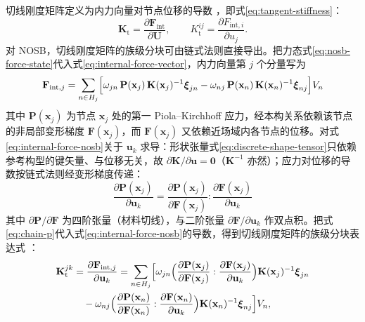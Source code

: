 切线刚度矩阵定义为内力向量对节点位移的导数 \cite{Littlewood2015}，即式\eqref{eq:tangent-stiffness}：
\begin{equation}
  \mathbf{K}_{\mathrm{t}}=\frac{\partial\mathbf{F}_{\mathrm{int}}}{\partial\mathbf{U}},
  \qquad
  K_{\mathrm{t}}^{ij}=\frac{\partial F_{\mathrm{int},i}}{\partial u_{j}}.
  \label{eq:tangent-stiffness}
\end{equation}
对 NOSB，切线刚度矩阵的族级分块可由链式法则直接导出。把力态式\eqref{eq:nosb-force-state}代入式\eqref{eq:internal-force-vector}，内力向量第 $j$ 个分量写为
\begin{equation}
  \mathbf{F}_{\mathrm{int},j}=\sum_{n\in H_{j}}\Bigl[
    \omega_{jn}\,\mathbf{P}(\mathbf{x}_j)\,\mathbf{K}(\mathbf{x}_j)^{-1}\boldsymbol{\xi}_{jn}
    -\omega_{nj}\,\mathbf{P}(\mathbf{x}_n)\,\mathbf{K}(\mathbf{x}_n)^{-1}\boldsymbol{\xi}_{nj}
  \Bigr]V_{n}
  \label{eq:internal-force-nosb}
\end{equation}
其中 $\mathbf{P}(\mathbf{x}_j)$ 为节点 $\mathbf{x}_j$ 处的第一 Piola--Kirchhoff 应力，经本构关系依赖该节点的非局部变形梯度 $\mathbf{F}(\mathbf{x}_j)$，而 $\mathbf{F}(\mathbf{x}_j)$ 又依赖近场域内各节点的位移。对式\eqref{eq:internal-force-nosb}关于 $\mathbf{u}_{k}$ 求导：形状张量式\eqref{eq:discrete-shape-tensor}只依赖参考构型的键矢量、与位移无关，故 $\partial\mathbf{K}/\partial\mathbf{u}=\mathbf{0}$（$\mathbf{K}^{-1}$ 亦然）；应力对位移的导数按链式法则经变形梯度传递：
\begin{equation}
  \frac{\partial\mathbf{P}(\mathbf{x}_j)}{\partial\mathbf{u}_{k}}
  =\frac{\partial\mathbf{P}(\mathbf{x}_j)}{\partial\mathbf{F}(\mathbf{x}_j)}
  :\frac{\partial\mathbf{F}(\mathbf{x}_j)}{\partial\mathbf{u}_{k}}
  \label{eq:chain-p}
\end{equation}
其中 $\partial\mathbf{P}/\partial\mathbf{F}$ 为四阶张量（材料切线），与二阶张量 $\partial\mathbf{F}/\partial\mathbf{u}_{k}$ 作双点积。把式\eqref{eq:chain-p}代入式\eqref{eq:internal-force-nosb}的导数，得到切线刚度矩阵的族级分块表达式 \cite{Hashim2020}：
\begin{equation}
\begin{split}
  \mathbf{K}_{\mathrm{t}}^{jk}
  &=\frac{\partial\mathbf{F}_{\mathrm{int},j}}{\partial\mathbf{u}_{k}}
  =\sum_{n\in H_{j}}\Bigl[
    \omega_{jn}\Bigl(\frac{\partial\mathbf{P}(\mathbf{x}_{j})}{\partial\mathbf{F}(\mathbf{x}_{j})}
      :\frac{\partial\mathbf{F}(\mathbf{x}_{j})}{\partial\mathbf{u}_{k}}\Bigr)\mathbf{K}(\mathbf{x}_{j})^{-1}\boldsymbol{\xi}_{jn}\\
  &\quad-\omega_{nj}\Bigl(\frac{\partial\mathbf{P}(\mathbf{x}_{n})}{\partial\mathbf{F}(\mathbf{x}_{n})}
      :\frac{\partial\mathbf{F}(\mathbf{x}_{n})}{\partial\mathbf{u}_{k}}\Bigr)\mathbf{K}(\mathbf{x}_{n})^{-1}\boldsymbol{\xi}_{nj}
  \Bigr]V_{n},
\end{split}
  \label{eq:tangent-nosb}
\end{equation}
